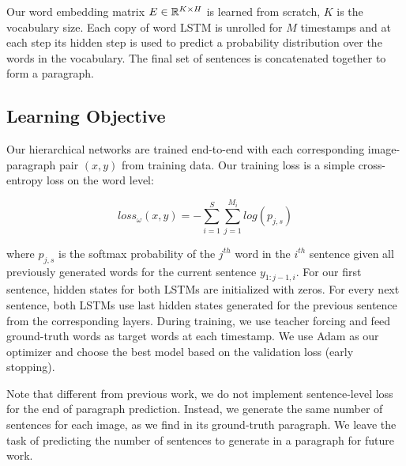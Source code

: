 \documentclass[11pt,a4paper]{article}
\newcommand{\R}{\mathbb{R}}
\begin{document}
Our word embedding matrix $E \in \R\sp{K \times H}$ is learned from scratch, $K$ is the vocabulary size.
Each copy of word LSTM is unrolled for $M$ timestamps and at each step its hidden step is used to predict a probability distribution over the words in the vocabulary.
The final set of sentences is concatenated together to form a paragraph.

\subsection{Learning Objective}
Our hierarchical networks are trained end-to-end with each corresponding image-paragraph pair $(x, y)$ from training data.
Our training loss is a simple cross-entropy loss on the word level:

\begin{equation}
    loss_{\omega}(x, y) = - \sum_{i=1}^{S}\sum_{j=1}^{M_i} log(p_{j,s})
\end{equation}

where $p_{j,s}$ is the softmax probability of the $j^{th}$ word in the $i^{th}$ sentence given all previously generated words for the current sentence $y_{1:j-1,i}$.
For our first sentence, hidden states for both LSTMs are initialized with zeros.
For every next sentence, both LSTMs use last hidden states generated for the previous sentence from the corresponding layers.
During training, we use teacher forcing and feed ground-truth words as target words at each timestamp.
We use Adam \cite{adam14} as our optimizer and choose the best model based on the validation loss (early stopping).

Note that different from previous work, we do not implement sentence-level loss for the end of paragraph prediction.
Instead, we generate the same number of sentences for each image, as we find in its ground-truth paragraph.
We leave the task of predicting the number of sentences to generate in a paragraph for future work.
\end{document}
